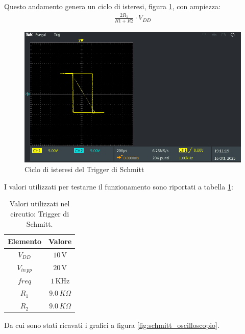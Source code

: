 \documentclass[a4paper,12pt]{article}
\begin{document}
Questo andamento genera un ciclo di isteresi, figura \ref{fig:schmitt_mod_xy}, con ampiezza:
\begin{align*}
    \frac{2R_1}{R1+R2} \cdot V_{DD}
\end{align*}

\begin{figure}[h]
    \centering
    \includegraphics[width = 0.6\linewidth]{immagini/schmitt/schmitt_vin_vout_xy.png}
    \caption{Ciclo di isteresi del Trigger di Schmitt}
    \label{fig:schmitt_mod_xy}
\end{figure}

I valori utilizzati per testarne il funzionamento sono riportati a tabella \ref{tab:valori_trigger_schmitt}:
\begin{table}[h]
    \centering
    \setlength{\tabcolsep}{20pt}
    \begin{tabular}{c c}
        \toprule
        Elemento        & Valore            \\
        \midrule
        $V_{DD}$        & $10\,\mathrm{V}$  \\
        $V_{in\,pp}$    & $20\,\mathrm{V}$  \\
        $freq$             & $1\,\mathrm{KHz}$ \\
        $R_1$           & $9.0\,K\Omega$      \\
        $R_2$           & $9.0\,K\Omega$      \\
        \bottomrule
    \end{tabular}
    \caption{Valori utilizzati nel circutio: Trigger di Schmitt.}
    \label{tab:valori_trigger_schmitt}
\end{table}

Da cui sono stati ricavati i grafici a figura \ref{fig:schmitt_oscilloscopio}.
\end{document}
